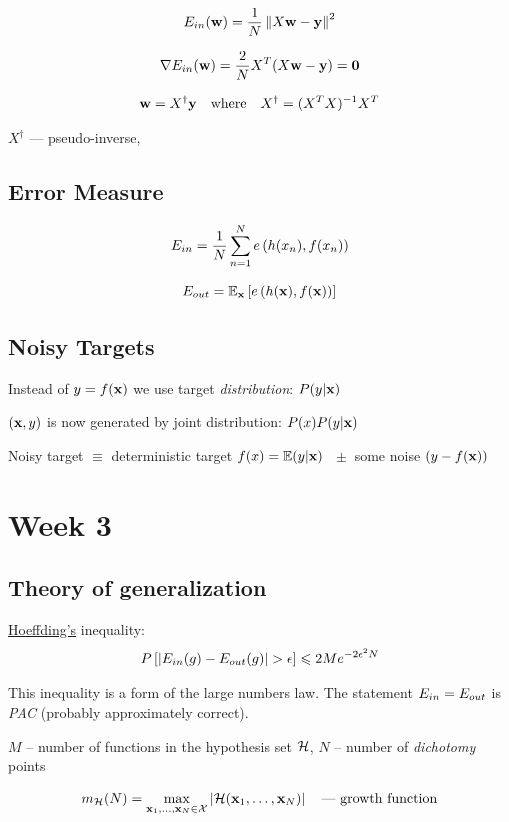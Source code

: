 \documentclass[a4paper,11pt]{article}
\renewcommand{\vec}[1]{\mathbf{#1}}
\begin{document}
\[ \iiEin(\iiw) = \frac{1}{N} \left\| X \iiw - \iiy \right\|^2 \]

\[ \nabla \iiEin(\iiw) = \frac{2}{N} X^T (X \iiw - \iiy) = \vec{0} \]

\[ \iiw = X^\dagger \iiy  \quad \text{where} \quad  X^\dagger = (X^T X)^{-1} X^T \]

$X^\dagger$ --- pseudo-inverse, 

\subsection{Error Measure}

\[ E_{in} = \frac{1}{N} \sum_{n=1}^{N} e\left(h(x_n),f(x_n)\right) \]

\[ \iiEout = \iiE_{\iix}\left[ e\left(h(\iix),f(\iix)\right) \right]  \]

\subsection{Noisy Targets}

Instead of $y=f(\iix)$ we use target \emph{distribution}: $ P(y|\iix) $

$(\iix,y)$ is now generated by joint distribution: $ P(x) P(y|\iix) $

Noisy target $\equiv$ deterministic target $f(x) = \iiE(y|\iix)$
$\; \pm$ some noise $\left( y - f(\iix) \right)$



\section{Week 3}

\subsection{Theory of generalization}

\def\iimH{m_\iiH}

\href{https://en.wikipedia.org/wiki/Hoeffding%27s_inequality}{Hoeffding's} inequality:
\[ P\left[|E_{in}(g) - E_{out}(g)| > \epsilon \right] \leqslant 2Me^{-2 \epsilon^2 N} \]

This inequality is a form of the large numbers law.
The statement $E_{in}=E_{out}$ is \emph{PAC} (probably approximately correct).

$M$ -- number of functions in the hypothesis set $\mathcal{H}$,
$N$ -- number of \emph{dichotomy} points

\[ \iimH(N) = \max_{\iix_1,\dots,\iix_N\in\iiX}
                    \left| \iiH(\iix_1,\dots,\iix_N) \right|
   \quad\text{--- growth function} \]
\end{document}
